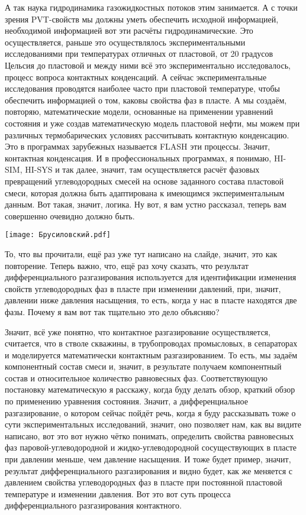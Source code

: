 \documentclass[main.tex]{subfiles}
\begin{document}
А так наука гидродинамика газожидкостных потоков этим занимается.
А с точки зрения PVT-свойств мы должны уметь обеспечить исходной информацией, необходимой информацией вот эти расчёты гидродинамические.
Это осуществляется, раньше это осуществлялось экспериментальными исследованиями при температурах отличных от пластовой, от 20 градусов Цельсия до пластовой и между ними всё это экспериментально исследовалось, процесс вопроса контактных конденсаций.
А сейчас экспериментальные исследования проводятся наиболее часто при пластовой температуре, чтобы обеспечить информацией о том, каковы свойства фаз в пласте.
А мы создаём, повторяю, математические модели, основанные на применении уравнений состояния и уже создав математическую модель пластовой нефти, мы можем при различных термобарических условиях рассчитывать контактную конденсацию.
Это в программах зарубежных называется FLASH эти процессы.
Значит, контактная конденсация.
И в профессиональных программах, я понимаю, HI-SIM, HI-SYS и так далее, значит, там осуществляется расчёт фазовых превращений углеводородных смесей на основе заданного состава пластовой смеси, которая должна быть адаптирована к имеющимся экспериментальным данным.
Вот такая, значит, логика.
Ну вот, я вам устно рассказал, теперь вам совершенно очевидно должно быть.

\begin{center}
\texttt{[image: Брусиловский.pdf]}
\end{center}

То, что вы прочитали, ещё раз уже тут написано на слайде, значит, это как повторение.
Теперь важно, что, ещё раз хочу сказать, что результат дифференциального разгазирования используется для идентификации изменения свойств углеводородных фаз в пласте при изменении давлений, при, значит, давлении ниже давления насыщения, то есть, когда у нас в пласте находятся две фазы.
Почему я вам вот так тщательно это дело объясняю?

Значит, всё уже понятно, что контактное разгазирование осуществляется, считается, что в стволе скважины, в трубопроводах промысловых, в сепараторах и моделируется математически контактным разгазированием.
То есть, мы задаём компонентный состав смеси и, значит, в результате получаем компонентный состав и относительное количество равновесных фаз.
Соответствующую постановку математическую я расскажу, когда буду делать обзор, краткий обзор по применению уравнения состояния.
Значит, а дифференциальное разгазирование, о котором сейчас пойдёт речь, когда я буду рассказывать тоже о сути экспериментальных исследований, значит, оно позволяет нам, как вы видите написано, вот это вот нужно чётко понимать, определить свойства равновесных фаз паровой-углеводородной и жидко-углеводородной сосуществующих в пласте при давлении меньше, чем давление насыщения.
И тоже будет пример, значит, результат дифференциального разгазирования и видно будет, как же меняется с давлением свойства углеводородных фаз в пласте при постоянной пластовой температуре и изменении давления.
Вот это вот суть процесса дифференциального разгазирования контактного.
\end{document}
